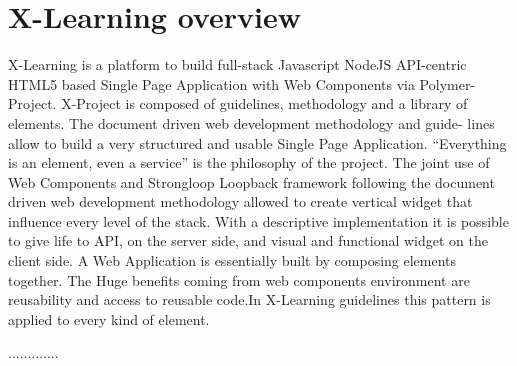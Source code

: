 \section{X-Learning overview}
\label{sec:x_learning_overview}

X-Learning is a platform to build full-stack Javascript NodeJS API-centric HTML5 based Single Page Application with Web Components via Polymer- Project. X-Project is composed of guidelines, methodology and a library of elements. The document driven web development methodology and guide- lines allow to build a very structured and usable Single Page Application. 
“Everything is an element, even a service” is the philosophy of the project. The joint use of Web Components and Strongloop Loopback framework following the document driven web development methodology allowed to create vertical widget that influence every level of the stack. With a descriptive implementation it is possible to give life to API, on the server side, and visual and functional widget on the client side. A Web Application is essentially built by composing elements together. The Huge benefits coming from web components environment are reusability and access to reusable code.In X-Learning guidelines this pattern is applied to every kind of element.

.............